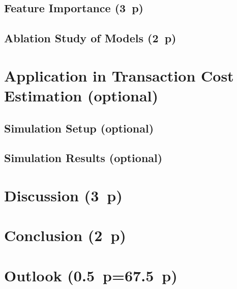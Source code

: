 \subsection{Feature Importance (3~p)}\label{sec:feature-importance}

\subsection{Ablation Study of Models (2~p)}\label{sec:ablation-study}

\newpage
\section{Application in Transaction Cost Estimation (optional)}\label{sec:application}
\subsection{Simulation Setup (optional)}\label{sec:simulation-setup}
\subsection{Simulation Results (optional)}\label{sec:simulation-results}

\newpage
\section{Discussion (3~p)}\label{sec:discussion}

\newpage
\section{Conclusion (2~p)}\label{sec:conclusion}

\newpage
\section{Outlook (0.5~p=67.5~p)}\label{sec:outlook}

